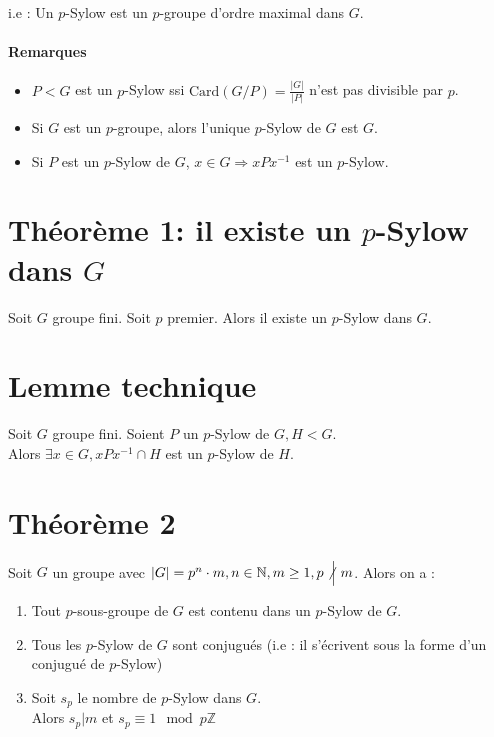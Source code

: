 \documentclass[a4paper,10pt]{report}
\newcommand{\IZ}{\mathbb{Z}} %
\newcommand{\IN}{\mathbb{N}} %
\newcommand{\so}{\Rightarrow}
\newcommand{\Card}[1]{\text{Card}\left( #1 \right)}
\newcommand{\Nmid}{\not\Big| \ }
\begin{document}
   i.e : Un $p$-Sylow est un $p$-groupe d'ordre maximal dans $G$.

   \paragraph{Remarques}
   \begin{itemize}
     \item  $P < G$ est un $p$-Sylow ssi $\Card{G/P}=\frac{|G|}{|P|}$ n'est pas
       divisible par $p$.
     \item Si $G$ est un $p$-groupe, alors l'unique $p$-Sylow de $G$ est $G$.
     \item Si $P$ est un $p$-Sylow de $G$, $x \in G \so xPx^{-1}$ est un
       $p$-Sylow.
     \begin{comment}
     \item voir cours 09/12/08 p1 verso : $p$-Sylow de $GL_n(\mathbb{F}_p)$,
       avec $\mathbb{F}_p=\IZ/p\IZ$
     \end{comment}
   \end{itemize}

  \section{Théorème 1: il existe un $p$-Sylow dans $G$}
   \begin{comment}
     Preuve : 09/12/08 p2. 
   \end{comment}
   Soit $G$ groupe fini. Soit $p$ premier. Alors il existe un $p$-Sylow dans
   $G$.

  \section{Lemme technique}
   Soit $G$ groupe fini. Soient $P$ un $p$-Sylow de $G, H < G$.\\
   Alors $\exists x \in G, xPx^{-1} \cap H$ est un $p$-Sylow de $H$.

  \section{Théorème 2}
   \begin{comment}
     Preuve : 10/12/08 p1. 
   \end{comment}
   Soit $G$ un groupe avec $|G|=p^n \cdot m, n \in \IN, m \geq 1, p \Nmid m$.
   Alors on a :
   \begin{enumerate}
     \item Tout $p$-sous-groupe de $G$ est contenu dans un $p$-Sylow de $G$.
     \item Tous les $p$-Sylow de $G$ sont conjugués (i.e : il s'écrivent sous la
       forme d'un conjugué de $p$-Sylow)
     \item Soit $s_p$ le nombre de $p$-Sylow dans $G$.\\
       Alors $s_p \Big| m$ et $s_p \equiv 1 \mod p\IZ$ 
   \end{enumerate}
\end{document}
